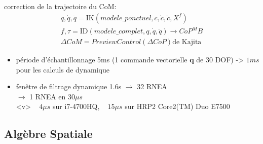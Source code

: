 \documentclass[10pt]{beamer}
\begin{document}
\begin{frame}
  \frametitle{} 	\hyperlink{ch_ID}{}
  \hypertarget{app_filDyn}{}
  
  
  correction de la trajectoire du CoM:
	\begin{align*}
	  q,\dot{q},\ddot{q} = \mathrm{IK}(modele\_ponctuel, c, \dot{c}, \ddot{c}, X^f) \\
	  f,\tau = \mathrm{ID}(modele\_complet,q,\dot{q},\ddot{q}) \longrightarrow CoP^MB \\
	  \Delta CoM = PreviewControl(\Delta CoP) \text{de Kajita}
	\end{align*}
  
  	\begin{itemize}
	\item période d'échantillonnage 5ms (1 commande vectorielle $\mathbf{q}$ de 30 DOF) -> $1ms$ pour les calculs de dynamique
	\item fenêtre de filtrage dynamique 1.6s $\longrightarrow$ 32 RNEA \\
	      $\longrightarrow$ 1 RNEA en $30\mu s$ \\
	      <v> ~ $4\mu s$ sur i7-4700HQ, ~ $15\mu s$ sur HRP2 Core2(TM) Duo E7500
	\end{itemize}
  
\end{frame}

\subsection{Algèbre Spatiale}
\end{document}
